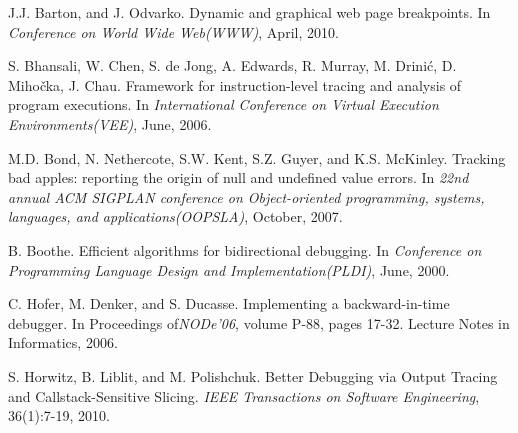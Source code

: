 \documentclass{sig-alternate}
\begin{document}
%

\begin{thebibliography}{16}

J.J. Barton, and J. Odvarko. \newblock Dynamic and graphical web page breakpoints.
\newblock In \emph{Conference on World Wide Web(WWW)},
April, 2010.

S. Bhansali, W. Chen, S. de Jong, A. Edwards, R. Murray, M. Drini\'{c}, D. Miho\v{c}ka, J. Chau. \newblock Framework for instruction-level tracing and analysis of program executions.
\newblock In \emph{International Conference on Virtual Execution Environments(VEE)},
June, 2006.

M.D. Bond, N. Nethercote, S.W. Kent, S.Z. Guyer, and K.S. McKinley. \newblock Tracking bad apples: reporting the origin of null and undefined value errors.
\newblock In \emph{22nd annual ACM SIGPLAN conference on Object-oriented programming, systems, languages, and applications(OOPSLA)},
October, 2007.


B. Boothe. \newblock Efficient algorithms for bidirectional debugging.
\newblock In \emph{Conference on Programming Language Design and Implementation(PLDI)},
June, 2000.




C. Hofer, M. Denker, and S. Ducasse. \newblock Implementing a backward-in-time debugger.
\newblock In Proceedings of\emph{NODe'06},
volume P-88, pages 17-32. Lecture Notes in Informatics, 2006.

S. Horwitz, B. Liblit, and M. Polishchuk. \newblock Better Debugging via Output Tracing and Callstack-Sensitive Slicing.
\emph{IEEE Transactions on
Software Engineering}, 36(1):7-19, 2010.


\end{thebibliography}
\end{document}
